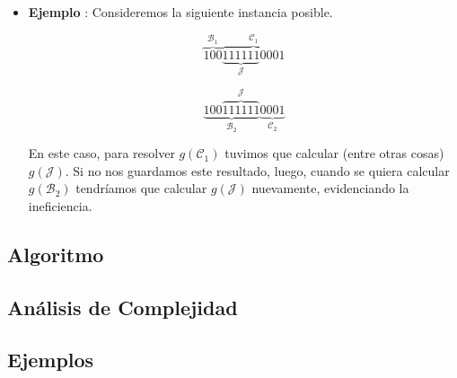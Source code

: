 \begin{itemize}
	\item \textbf{Ejemplo} : Consideremos la siguiente instancia posible.
	
	 $$\overset{\mathcal{B}_1}{\overbrace{100}} \overset{\mathcal{C}_1}{\overbrace{\underset{\mathcal{J}}{\underbrace{111111}}0001}}$$
	
	$$\underset{\mathcal{B}_2}{\underbrace{100\overset{\mathcal{J}}{\overbrace{111111}}}}\underset{\mathcal{C}_2}{\underbrace{0001}}$$
	
	En este caso, para resolver $g(\mathcal{C}_1)$ tuvimos que calcular (entre otras cosas) $g(\mathcal{J})$. Si no nos guardamos este resultado, luego, cuando se quiera calcular $g(\mathcal{B}_2)$ tendríamos que calcular $g(\mathcal{J})$ nuevamente, evidenciando la ineficiencia.
\end{itemize} 

\subsection*{Algoritmo}


\subsection*{Análisis de Complejidad}

\subsection*{Ejemplos}
